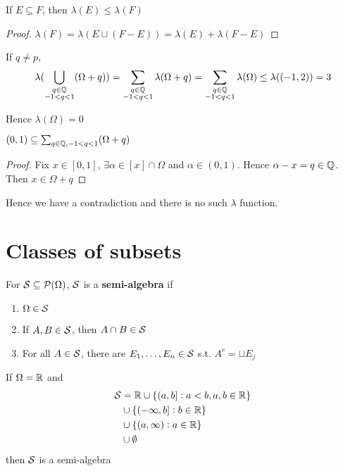 \documentclass[11pt]{article}
\begin{document}
\begin{claim}
If \(E\subseteq F\), then \(\lambda(E)\le\lambda(F)\)
\end{claim}

\begin{proof}
\(\lambda(F)=\lambda(E\cup(F-E))=\lambda(E)+\lambda(F-E)\)
\end{proof}

If \(q\neq p\),
\begin{equation*}
\lambda(\displaystyle\bigcup_{\substack{q\in\mathbb{Q}\\-1<q<1}}(\Omega+q))
=\displaystyle\sum_{\substack{q\in\mathbb{Q}\\-1<q<1}}\lambda(\Omega+q)
=\displaystyle\sum_{\substack{q\in\mathbb{Q}\\-1<q<1}}\lambda(\Omega)
\le\lambda((-1,2))
=3
\end{equation*}

Hence \(\lambda(\Omega)=0\)

\begin{claim}
\((0,1)\subseteq\sum_{q\in\mathbb{Q},-1<q<1}(\Omega+q)\)
\end{claim}

\begin{proof}
Fix \(x\in[0,1]\), \(\exists\alpha\in[x]\cap\Omega\) and \(\alpha\in(0,1)\). Hence
\(\alpha-x=q\in\mathbb{Q}\). Then \(x\in\Omega+q\)
\end{proof}

Hence we have a contradiction and there is no such \(\lambda\) function.

\section{Classes of subsets}
\label{sec:org4b91bf0}
\begin{definition}[]
For \(\mathcal{S}\subseteq\mathcal{P}(\Omega)\), \(\mathcal{S}\) is a \textbf{semi-algebra} if
\begin{enumerate}
\item \(\Omega\in\mathcal{S}\)
\item If \(A,B\in\mathcal{S}\), then \(A\cap B\in\mathcal{S}\)
\item For all \(A\in\mathcal{S}\), there are \(E_1,\dots,E_n\in\mathcal{S}\) s.t. \(A^c=\sqcup E_j\)
\end{enumerate}
\end{definition}

\begin{examplle}[]
If \(\Omega=\mathbb{R}\) and 
\begin{align*}
\mathcal{S}&=\mathbb{R}\cup\{(a,b]:a<b,a,b\in\mathbb{R}\}\\
&\cup\{(-\infty,b]:b\in\mathbb{R}\}\\
&\cup\{(a,\infty):a\in\mathbb{R}\}\\
&\cup\emptyset
\end{align*}
then \(\mathcal{S}\) is a semi-algebra
\end{examplle}
\end{document}
